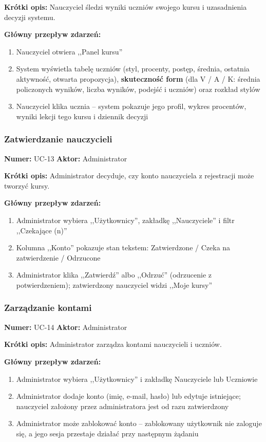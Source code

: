 \textbf{Krótki opis:} Nauczyciel śledzi wyniki uczniów swojego kursu i uzasadnienia decyzji systemu.

\textbf{Główny przepływ zdarzeń:}
\begin{enumerate}[leftmargin=*]
    \item Nauczyciel otwiera ,,Panel kursu''
    \item System wyświetla tabelę uczniów (styl, procenty, postęp, średnia, ostatnia aktywność, otwarta propozycja), \textbf{skuteczność form} (dla V / A / K: średnia policzonych wyników, liczba wyników, podejść i uczniów) oraz rozkład stylów
    \item Nauczyciel klika ucznia -- system pokazuje jego profil, wykres procentów, wyniki lekcji tego kursu i dziennik decyzji
\end{enumerate}

\subsubsection{Zatwierdzanie nauczycieli}
\textbf{Numer:} UC-13 \quad \textbf{Aktor:} Administrator

\textbf{Krótki opis:} Administrator decyduje, czy konto nauczyciela z rejestracji może tworzyć kursy.

\textbf{Główny przepływ zdarzeń:}
\begin{enumerate}[leftmargin=*]
    \item Administrator wybiera ,,Użytkownicy'', zakładkę ,,Nauczyciele'' i filtr ,,Czekające (n)''
    \item Kolumna ,,Konto'' pokazuje stan tekstem: Zatwierdzone / Czeka na zatwierdzenie / Odrzucone
    \item Administrator klika ,,Zatwierdź'' albo ,,Odrzuć'' (odrzucenie z potwierdzeniem); zatwierdzony nauczyciel widzi ,,Moje kursy''
\end{enumerate}

\subsubsection{Zarządzanie kontami}
\textbf{Numer:} UC-14 \quad \textbf{Aktor:} Administrator

\textbf{Krótki opis:} Administrator zarządza kontami nauczycieli i uczniów.

\textbf{Główny przepływ zdarzeń:}
\begin{enumerate}[leftmargin=*]
    \item Administrator wybiera ,,Użytkownicy'' i zakładkę Nauczyciele lub Uczniowie
    \item Administrator dodaje konto (imię, e-mail, hasło) lub edytuje istniejące; nauczyciel założony przez administratora jest od razu zatwierdzony
    \item Administrator może zablokować konto -- zablokowany użytkownik nie zaloguje się, a jego sesja przestaje działać przy następnym żądaniu
\end{enumerate}

